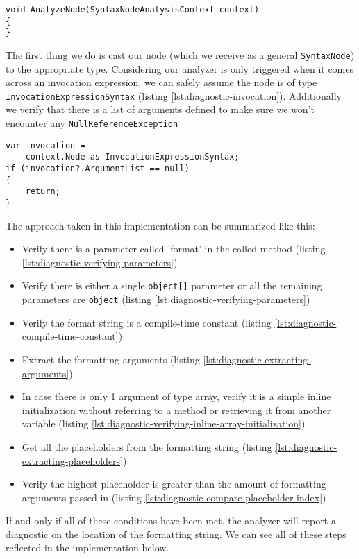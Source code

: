 \begin{lstlisting}[label={lst:diagnostic-analyzenode}]
void AnalyzeNode(SyntaxNodeAnalysisContext context)
{
}
\end{lstlisting}

The first thing we do is cast our node (which we receive as a general \texttt{SyntaxNode}) to the appropriate type. Considering our analyzer is only triggered when it comes across an \gls{invocation} expression, we can safely assume the node is of type \texttt{InvocationExpressionSyntax} (listing \ref{lst:diagnostic-invocation}). Additionally we verify that there is a list of arguments defined to make sure we won't encounter any \texttt{NullReferenceException}

\begin{lstlisting}[label={lst:diagnostic-invocation}]
var invocation = 
	context.Node as InvocationExpressionSyntax;
if (invocation?.ArgumentList == null)
{
	return;
}
\end{lstlisting}

\begin{minipage}{\linewidth}
The approach taken in this implementation can be summarized like this:

\begin{itemize}
\setlength\itemsep{1em}
\item Verify there is a parameter called 'format' in the called method (listing \ref{lst:diagnostic-verifying-parameters})
\item Verify there is either a single \texttt{object[]} parameter or all the remaining parameters are \texttt{object} (listing \ref{lst:diagnostic-verifying-parameters})
\item Verify the format string is a compile-time constant (listing \ref{lst:diagnostic-compile-time-constant})
\item Extract the formatting arguments (listing \ref{lst:diagnostic-extracting-arguments})
\item In case there is only 1 argument of type array, verify it is a simple inline initialization without referring to a method or retrieving it from another variable (listing \ref{lst:diagnostic-verifying-inline-array-initialization})
\item Get all the placeholders from the formatting string (listing \ref{lst:diagnostic-extracting-placeholders})
\item Verify the highest placeholder is greater than the amount of formatting arguments passed in (listing \ref{lst:diagnostic-compare-placeholder-index})
\end{itemize}

\noindent If and only if all of these conditions have been met, the analyzer will report a diagnostic on the location of the formatting string. We can see all of these steps reflected in the implementation below.
\end{minipage}



